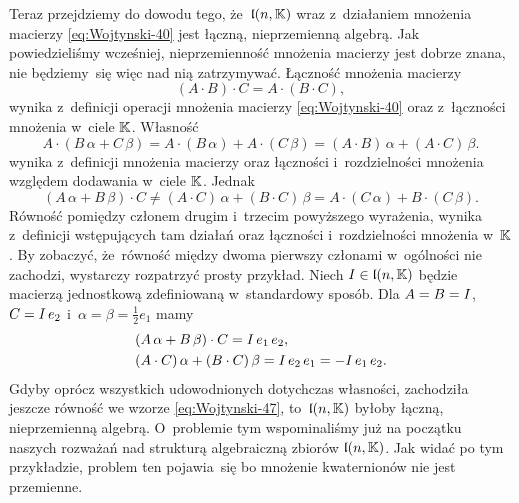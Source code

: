 \documentclass[a4paper,11pt]{article}
\begin{document}
Teraz przejdziemy do dowodu tego, że~$\mathfrak{l}( n, \mathbb{K} )$ wraz z~działaniem
mnożenia macierzy \eqref{eq:Wojtynski-40} jest łączną, nieprzemienną
algebrą. Jak powiedzieliśmy wcześniej, nieprzemienność mnożenia macierzy
jest dobrze znana, nie będziemy~się więc nad nią zatrzymywać. Łączność
mnożenia macierzy
\begin{equation}
  \label{eq:Wojtynski-45}
  ( A \cdot B ) \cdot C = A \cdot ( B \cdot C ),
\end{equation}
wynika z~definicji operacji mnożenia macierzy \eqref{eq:Wojtynski-40} oraz
z~łączności mnożenia w~ciele $\mathbb{K}$. Własność
\begin{equation}
  \label{eq:Wojtynski-46}
  A \cdot ( B \, \alpha + C \, \beta ) = A \cdot ( B \, \alpha ) + A \cdot ( C \, \beta ) =
  ( A \cdot B ) \, \alpha + ( A \cdot C ) \, \beta.
\end{equation}
wynika z~definicji mnożenia macierzy oraz łączności i~rozdzielności
mnożenia względem dodawania w~ciele $\mathbb{K}$. Jednak
\begin{equation}
  \label{eq:Wojtynski-47}
  ( A \, \alpha + B \, \beta ) \cdot C \neq
  ( A \cdot C ) \, \alpha + ( B \cdot C ) \, \beta =
  A \cdot ( C \, \alpha ) + B \cdot ( C \, \beta ).
\end{equation}
Równość pomiędzy członem drugim i~trzecim powyższego wyrażenia, wynika
z~definicji wstępujących tam działań oraz łączności i~rozdzielności
mnożenia w~$\mathbb{K}$. By zobaczyć, że~równość między dwoma pierwszy członami
w~ogólności nie zachodzi, wystarczy rozpatrzyć prosty przykład. Niech
$I \in \mathfrak{l}( n, \mathbb{K} )$ będzie macierzą jednostkową zdefiniowaną
w~standardowy sposób. Dla $A = B = I$, $C = I \, e_{ 2 }$
i~$\alpha = \beta = \frac{ 1 }{ 2 } e_{ 1 }$ mamy
\begin{subequations}
  \begin{align}
    \label{eq:Wojtynski-48-A}
    &( A \, \alpha + B \, \beta ) \cdot C = I \, e_{ 1 } \, e_{ 2 }, \\
    \label{eq:Wojtynski-48-B}
    &( A \cdot C ) \, \alpha + ( B \cdot C ) \, \beta = I \, e_{ 2 } \, e_{ 1 } =
      -I \, e_{ 1 } \, e_{ 2 }.
  \end{align}
\end{subequations}
Gdyby oprócz wszystkich udowodnionych dotychczas własności, zachodziła
jeszcze równość we wzorze \eqref{eq:Wojtynski-47}, to~$\mathfrak{l}( n, \mathbb{K} )$
byłoby łączną, nieprzemienną algebrą. O~problemie tym wspominaliśmy już
na początku naszych rozważań nad strukturą algebraiczną zbiorów
$\mathfrak{l}( n, \mathbb{K} )$. Jak widać po tym przykładzie, problem ten pojawia~się
bo mnożenie kwaternionów nie jest przemienne.
\end{document}
